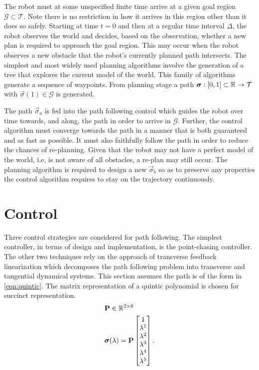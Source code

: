 The robot must at some unspecified finite time arrive at a given goal region $\mathcal{G}\subset\mathcal{T}$. Note there is no restriction in how it arrives in this region other than it does so safely. Starting at time $t=0$ and then at a regular time interval $\Delta$, the robot observes the world and decides, based on the observation, whether a new plan is required to approach the goal region. This may occur when the robot observes a new obstacle that the robot's currently planned path intersects. The simplest and most widely used planning algorithms involve the generation of a tree that explores the current model of the world. This family of algorithms generate a sequence of waypoints. From planning stage a path $\bm{\sigma}: [0,1]\subset\mathbb{R}\to\mathcal{T}$ with $\vec{\sigma}(1)\in\mathcal{G}$ is generated.

The path $\vec{\sigma}_a$ is fed into the path following control which guides the robot over time towards, and along, the path in order to arrive in $\mathcal{G}$. Further, the control algorithm must converge towards the path in a manner that is both guaranteed and as fast as possible. It must also faithfully follow the path in order to reduce the chances of re-planning. Given that the robot may not have a perfect model of the world, i.e, is not aware of all obstacles, a re-plan may still occur. The planning algorithm is required to design a new $\vec{\sigma}_b$ so as to preserve any properties the control algorithm requires to stay on the trajectory continuously.

\chapter{Control}\label{sec:control}
Three control strategies are considered for path following. The simplest controller, in terms of design and implementation, is the point-chasing controller. The other two techniques rely on the approach of transverse feedback linearization which decomposes the path following problem into transverse and tangential dynamical systems. This section assumes the path is of the form in \eqref{eqn:quintic}. The matrix representation of a quintic polynomial is chosen for succinct representation.
\begin{align}
    &\mathbf{P}\in\mathbb{R}^{2\times6} \nonumber \\
    &\bm{\sigma}(\lambda) =    \mathbf{P}
                                \begin{bmatrix}
                                    1 \\
                                    \lambda^1 \\
                                    \lambda^2 \\
                                    \lambda^3 \\
                                    \lambda^4 \\
                                    \lambda^5
                                \end{bmatrix}.
    \label{eqn:quintic}
\end{align}

